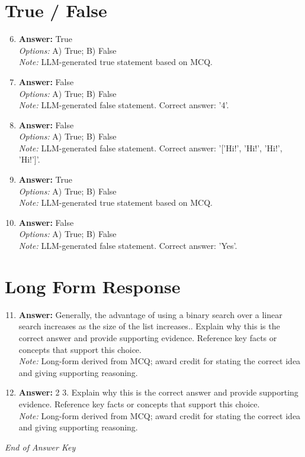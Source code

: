 \documentclass[12pt]{article}
\begin{document}
\section*{True / False}
\begin{enumerate}[label=\arabic*.]
\setcounter{enumi}{5}
\item \textbf{Answer:} True
\\ \textit{Options:} A) True; B) False
\\ \textit{Note:} LLM-generated true statement based on MCQ.
\item \textbf{Answer:} False
\\ \textit{Options:} A) True; B) False
\\ \textit{Note:} LLM-generated false statement. Correct answer: '4'.
\item \textbf{Answer:} False
\\ \textit{Options:} A) True; B) False
\\ \textit{Note:} LLM-generated false statement. Correct answer: '['Hi!', 'Hi!', 'Hi!', 'Hi!']'.
\item \textbf{Answer:} True
\\ \textit{Options:} A) True; B) False
\\ \textit{Note:} LLM-generated true statement based on MCQ.
\item \textbf{Answer:} False
\\ \textit{Options:} A) True; B) False
\\ \textit{Note:} LLM-generated false statement. Correct answer: 'Yes'.
\end{enumerate}

\section*{Long Form Response}
\begin{enumerate}[label=\arabic*.]
\setcounter{enumi}{10}
\item \textbf{Answer:} Generally, the advantage of using a binary search over a linear search increases as the size of the list increases.. Explain why this is the correct answer and provide supporting evidence. Reference key facts or concepts that support this choice.
\\ \textit{Note:} Long-form derived from MCQ; award credit for stating the correct idea and giving supporting reasoning.
\item \textbf{Answer:} 2 3. Explain why this is the correct answer and provide supporting evidence. Reference key facts or concepts that support this choice.
\\ \textit{Note:} Long-form derived from MCQ; award credit for stating the correct idea and giving supporting reasoning.
\end{enumerate}

\vfill
\noindent\textit{End of Answer Key}
\end{document}
